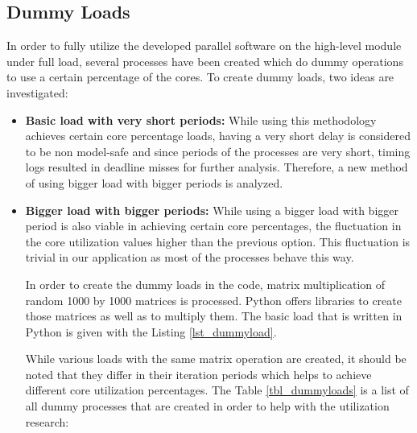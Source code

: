 \subsection{Dummy Loads}
In order to fully utilize the developed parallel software on the high-level module under full load, several processes have been created which do dummy operations to use a certain percentage of the cores. To create dummy loads, two ideas are investigated:
\begin{itemize}
	\item \textbf{Basic load with very short periods:} While using this methodology achieves certain core percentage loads, having a very short delay is considered to be non model-safe and since periods of the processes are very short, timing logs resulted in deadline misses for further analysis. Therefore, a new method of using bigger load with bigger periods is analyzed.
	
	\item \textbf{Bigger load with bigger periods:} While using a bigger load with bigger period is also viable in achieving certain core percentages, the fluctuation in the core utilization values higher than the previous option. This fluctuation is trivial in our application as most of the processes behave this way.
	
	
	
	In order to create the dummy loads in the code, matrix multiplication of random 1000 by 1000 matrices is processed. Python offers libraries to create those matrices as well as to multiply them. The basic load that is written in Python is given with the Listing \ref{lst_dummyload}.
	
	While various loads with the same matrix operation are created, it should be noted that they differ in their iteration periods which helps to achieve different core utilization percentages. The Table \ref{tbl_dummyloads} is a list of all dummy processes that are created in order to help with the utilization research:
	

\end{itemize}
